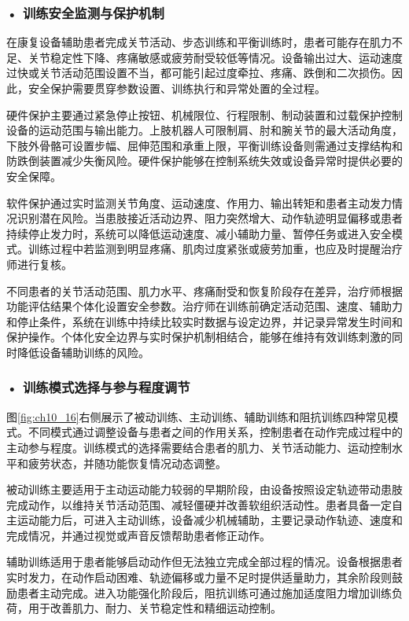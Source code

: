 \subsubsection*{\textbf{• 训练安全监测与保护机制}}

在康复设备辅助患者完成关节活动、步态训练和平衡训练时，患者可能存在肌力不足、关节稳定性下降、疼痛敏感或疲劳耐受较低等情况。设备输出过大、运动速度过快或关节活动范围设置不当，都可能引起过度牵拉、疼痛、跌倒和二次损伤。因此，安全保护需要贯穿参数设置、训练执行和异常处置的全过程。

硬件保护主要通过紧急停止按钮、机械限位、行程限制、制动装置和过载保护控制设备的运动范围与输出能力。上肢机器人可限制肩、肘和腕关节的最大活动角度，下肢外骨骼可设置步幅、屈伸范围和承重上限，平衡训练设备则需通过支撑结构和防跌倒装置减少失衡风险。硬件保护能够在控制系统失效或设备异常时提供必要的安全保障。

软件保护通过实时监测关节角度、运动速度、作用力、输出转矩和患者主动发力情况识别潜在风险。当患肢接近活动边界、阻力突然增大、动作轨迹明显偏移或患者持续停止发力时，系统可以降低运动速度、减小辅助力量、暂停任务或进入安全模式。训练过程中若监测到明显疼痛、肌肉过度紧张或疲劳加重，也应及时提醒治疗师进行复核。

不同患者的关节活动范围、肌力水平、疼痛耐受和恢复阶段存在差异，治疗师根据功能评估结果个体化设置安全参数。治疗师在训练前确定活动范围、速度、辅助力和停止条件，系统在训练中持续比较实时数据与设定边界，并记录异常发生时间和保护操作。个体化安全边界与实时保护机制相结合，能够在维持有效训练刺激的同时降低设备辅助训练的风险。


\subsubsection*{\textbf{• 训练模式选择与参与程度调节}}

图\ref{fig:ch10_16}右侧展示了被动训练、主动训练、辅助训练和阻抗训练四种常见模式。不同模式通过调整设备与患者之间的作用关系，控制患者在动作完成过程中的主动参与程度。训练模式的选择需要结合患者的肌力、关节活动能力、运动控制水平和疲劳状态，并随功能恢复情况动态调整。

被动训练主要适用于主动运动能力较弱的早期阶段，由设备按照设定轨迹带动患肢完成动作，以维持关节活动范围、减轻僵硬并改善软组织活动性。患者具备一定自主运动能力后，可进入主动训练，设备减少机械辅助，主要记录动作轨迹、速度和完成情况，并通过视觉或声音反馈帮助患者修正动作。

辅助训练适用于患者能够启动动作但无法独立完成全部过程的情况。设备根据患者实时发力，在动作启动困难、轨迹偏移或力量不足时提供适量助力，其余阶段则鼓励患者主动完成。进入功能强化阶段后，阻抗训练可通过施加适度阻力增加训练负荷，用于改善肌力、耐力、关节稳定性和精细运动控制。

